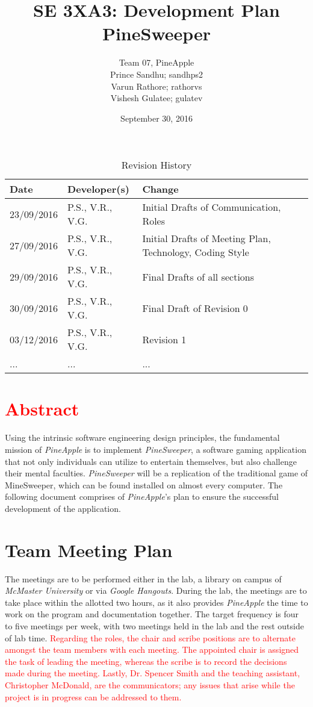 \documentclass{article}
\title{SE 3XA3: Development Plan\\PineSweeper}
\author{Team 07, PineApple
		\\ Prince Sandhu; sandhps2
		\\ Varun Rathore; rathorvs
		\\ Vishesh Gulatee; gulatev
}
\date{September 30, 2016}
\begin{document}
\begin{table}[hp]
\caption{Revision History} \label{TblRevisionHistory}
\begin{tabularx}{\textwidth}{llX}
\toprule
\textbf{Date} & \textbf{Developer(s)} & \textbf{Change}\\
\midrule
23/09/2016 & P.S., V.R., V.G. & Initial Drafts of Communication, Roles\\
27/09/2016 & P.S., V.R., V.G. & Initial Drafts of Meeting Plan, Technology, Coding Style\\
29/09/2016 & P.S., V.R., V.G. & Final Drafts of all sections\\
30/09/2016 & P.S., V.R., V.G. & Final Draft of Revision 0\\
03/12/2016 & P.S., V.R., V.G. & Revision 1\\
... & ... & ...\\
\bottomrule
\end{tabularx}
\end{table}

\newpage
\maketitle

\section{\textcolor{red}{Abstract}}
Using the intrinsic software engineering design principles, the fundamental mission of \textit{PineApple} is to implement \textit{PineSweeper},
 a software gaming application that not only individuals can utilize to entertain themselves, but also challenge their mental faculties. 
\textit{PineSweeper} will be a replication of the traditional game of MineSweeper, which can be found installed on almost every computer.
The following document comprises of \textit{PineApple}'s plan to ensure the successful development of the application.

\section{Team Meeting Plan}
The meetings are to be performed either in the lab, a library on campus of \textit{McMaster University} or via \textit{Google Hangouts}. During
the lab, the meetings are to take place within the allotted two hours, as it also provides \textit{PineApple} the time to work on the program and 
documentation together. The target frequency is four to five meetings per week, with two meetings held in the lab and the rest outside of lab
time. \textcolor{red}{Regarding the roles, the chair and scribe positions are to alternate amongst the team members with each meeting. The
appointed chair is assigned the task of leading the meeting, whereas the scribe is to record the decisions made during the meeting. Lastly,
Dr. Spencer Smith and the teaching assistant, Christopher McDonald, are the communicators; any issues that arise while the project is in
progress can be addressed to them.}
\end{document}
